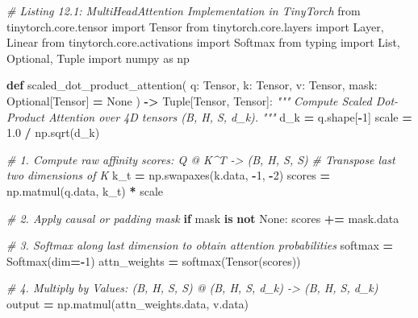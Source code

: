 \documentclass[
  letterpaper,
]{scrbook}
\newenvironment{Shaded}{\begin{snugshade}}{\end{snugshade}}
\newcommand{\CommentTok}[1]{\textcolor[rgb]{0.56,0.35,0.01}{\textit{#1}}}
\newcommand{\ControlFlowTok}[1]{\textcolor[rgb]{0.13,0.29,0.53}{\textbf{#1}}}
\newcommand{\DecValTok}[1]{\textcolor[rgb]{0.00,0.00,0.81}{#1}}
\newcommand{\FloatTok}[1]{\textcolor[rgb]{0.00,0.00,0.81}{#1}}
\newcommand{\ImportTok}[1]{#1}
\newcommand{\KeywordTok}[1]{\textcolor[rgb]{0.13,0.29,0.53}{\textbf{#1}}}
\newcommand{\NormalTok}[1]{#1}
\newcommand{\OperatorTok}[1]{\textcolor[rgb]{0.81,0.36,0.00}{\textbf{#1}}}
\newcommand{\VariableTok}[1]{\textcolor[rgb]{0.00,0.00,0.00}{#1}}
\begin{document}
\begin{Shaded}
\begin{Highlighting}[]
\CommentTok{\# Listing 12.1: MultiHeadAttention Implementation in TinyTorch}
\ImportTok{from}\NormalTok{ tinytorch.core.tensor }\ImportTok{import}\NormalTok{ Tensor}
\ImportTok{from}\NormalTok{ tinytorch.core.layers }\ImportTok{import}\NormalTok{ Layer, Linear}
\ImportTok{from}\NormalTok{ tinytorch.core.activations }\ImportTok{import}\NormalTok{ Softmax}
\ImportTok{from}\NormalTok{ typing }\ImportTok{import}\NormalTok{ List, Optional, Tuple}
\ImportTok{import}\NormalTok{ numpy }\ImportTok{as}\NormalTok{ np}

\KeywordTok{def}\NormalTok{ scaled\_dot\_product\_attention(}
\NormalTok{    q: Tensor,}
\NormalTok{    k: Tensor,}
\NormalTok{    v: Tensor,}
\NormalTok{    mask: Optional[Tensor] }\OperatorTok{=} \VariableTok{None}
\NormalTok{) }\OperatorTok{{-}\textgreater{}}\NormalTok{ Tuple[Tensor, Tensor]:}
    \CommentTok{"""}
\CommentTok{    Compute Scaled Dot{-}Product Attention over 4D tensors (B, H, S, d\_k).}
\CommentTok{    """}
\NormalTok{    d\_k }\OperatorTok{=}\NormalTok{ q.shape[}\OperatorTok{{-}}\DecValTok{1}\NormalTok{]}
\NormalTok{    scale }\OperatorTok{=} \FloatTok{1.0} \OperatorTok{/}\NormalTok{ np.sqrt(d\_k)}

    \CommentTok{\# 1. Compute raw affinity scores: Q @ K\^{}T {-}\textgreater{} (B, H, S, S)}
    \CommentTok{\# Transpose last two dimensions of K}
\NormalTok{    k\_t }\OperatorTok{=}\NormalTok{ np.swapaxes(k.data, }\OperatorTok{{-}}\DecValTok{1}\NormalTok{, }\OperatorTok{{-}}\DecValTok{2}\NormalTok{)}
\NormalTok{    scores }\OperatorTok{=}\NormalTok{ np.matmul(q.data, k\_t) }\OperatorTok{*}\NormalTok{ scale}

    \CommentTok{\# 2. Apply causal or padding mask}
    \ControlFlowTok{if}\NormalTok{ mask }\KeywordTok{is} \KeywordTok{not} \VariableTok{None}\NormalTok{:}
\NormalTok{        scores }\OperatorTok{+=}\NormalTok{ mask.data}

    \CommentTok{\# 3. Softmax along last dimension to obtain attention probabilities}
\NormalTok{    softmax }\OperatorTok{=}\NormalTok{ Softmax(dim}\OperatorTok{={-}}\DecValTok{1}\NormalTok{)}
\NormalTok{    attn\_weights }\OperatorTok{=}\NormalTok{ softmax(Tensor(scores))}

    \CommentTok{\# 4. Multiply by Values: (B, H, S, S) @ (B, H, S, d\_k) {-}\textgreater{} (B, H, S, d\_k)}
\NormalTok{    output }\OperatorTok{=}\NormalTok{ np.matmul(attn\_weights.data, v.data)}


\end{Highlighting}
\end{Shaded}
\end{document}
